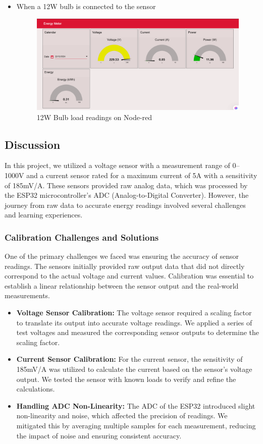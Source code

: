 \documentclass[a4paper,12pt]{report}
\begin{document}
\begin{itemize}
\begin{figure}[H]
        \label{fig:No load on Node-red}
    \end{figure}
    \item When a 12W bulb is connected to the sensor
    \begin{figure}[H]
        \centering
        \includegraphics[width=1.0\linewidth]{Project/Screenshot 2024-12-22 163714.png}
        \caption{12W Bulb load readings on Node-red}
        \label{fig:Load on Node-red}
    \end{figure}
\end{itemize}

\subsection{Discussion}
In this project, we utilized a voltage sensor with a measurement range of 0–1000V and a current sensor rated for a maximum current of 5A with a sensitivity of 185mV/A. These sensors provided raw analog data, which was processed by the ESP32 microcontroller’s ADC (Analog-to-Digital Converter). However, the journey from raw data to accurate energy readings involved several challenges and learning experiences.
\subsubsection{Calibration Challenges and Solutions}
One of the primary challenges we faced was ensuring the accuracy of sensor readings. The sensors initially provided raw output data that did not directly correspond to the actual voltage and current values. Calibration was essential to establish a linear relationship between the sensor output and the real-world measurements.
\begin{itemize}
    \item \textbf{Voltage Sensor Calibration:} The voltage sensor required a scaling factor to translate its output into accurate voltage readings. We applied a series of test voltages and measured the corresponding sensor outputs to determine the scaling factor.
    \item \textbf{Current Sensor Calibration:} For the current sensor, the sensitivity of 185mV/A was utilized to calculate the current based on the sensor's voltage output. We tested the sensor with known loads to verify and refine the calculations.\
    \item \textbf{Handling ADC Non-Linearity:} The ADC of the ESP32 introduced slight non-linearity and noise, which affected the precision of readings. We mitigated this by averaging multiple samples for each measurement, reducing the impact of noise and ensuring consistent accuracy.
\end{itemize}
\end{document}
